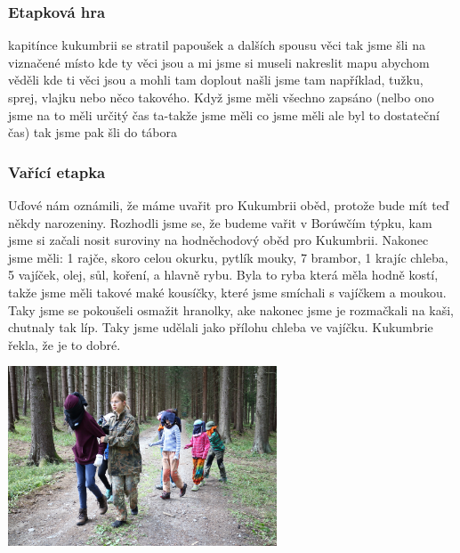 
\subsubsection{Etapková hra} %
\label{ssub:etapková_hra2}

kapitínce kukumbrii se stratil papoušek a dalších spousu věci tak jsme šli na viznačené místo kde ty věci jsou a mi jsme si museli nakreslit mapu abychom věděli kde ti věci jsou a mohli tam doplout našli jsme tam například, tužku, sprej, vlajku nebo něco takového. Když jsme měli všechno zapsáno (nelbo ono jsme na to měli určitý čas ta-takže jsme měli co jsme měli ale byl to dostateční čas) tak jsme pak šli do tábora


\subsubsection{Vařící etapka} %
\label{ssub:vařící_etapka}

Uďové nám oznámili, že máme uvařit pro Kukumbrii oběd, protože bude mít teď někdy narozeniny. Rozhodli jsme se, že budeme vařit v Borúwčím týpku, kam jsme si začali nosit suroviny na hodněchodový oběd pro Kukumbrii. Nakonec jsme měli: 1 rajče, skoro celou okurku, pytlík mouky, 7 brambor, 1 krajíc chleba, 5 vajíček, olej, sůl, koření, a hlavně rybu. Byla to ryba která měla hodně kostí, takže jsme měli takové maké kousíčky, které jsme smíchali s vajíčkem a moukou. Taky jsme se pokoušeli osmažit hranolky, ake nakonec jsme je rozmačkali na kaši, chutnaly tak líp. Taky jsme udělali jako přílohu chleba ve vajíčku. Kukumbrie řekla, že je to dobré.

\begin{center}
	\includegraphics[width=8cm]{img/anpetu_tabor/vorvo.JPG}
\end{center}

